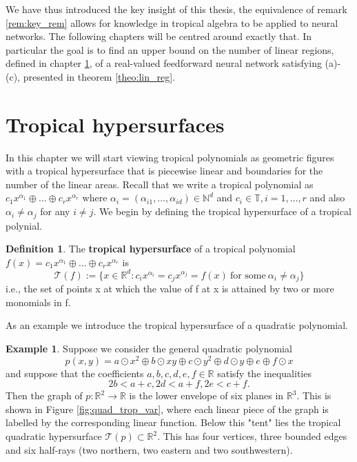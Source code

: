 \documentclass{article}
\theoremstyle{definition}
\newtheorem{definition}[theorem]{Definition}
\newtheorem{example}[theorem]{Example}
\begin{document}
We have thus introduced the key insight of this thesis, the equivalence of remark \ref{rem:key_rem} allows for knowledge in tropical algebra to be applied to neural networks. The following chapters will be centred around exactly that. In particular the goal is to find an upper bound on the number of linear regions, defined in chapter \ref{sec:tropical_hypersurfaces}, of a real-valued feedforward neural network satisfying (a)-(c), presented in theorem \ref{theo:lin_reg}.

\newpage

\section{Tropical hypersurfaces}
\label{sec:tropical_hypersurfaces}

In this chapter we will start viewing tropical polynomials as geometric figures with a tropical hypersurface that is piecewise linear and boundaries for the number of the linear areas. Recall that we write a tropical polynomial as $c_1 x^{\alpha_1} \oplus \dots \oplus c_r x^{\alpha_r}$ where $\alpha_i = (\alpha_{i1}, \dots , \alpha_{id}) \in \mathbb{N}^{d}$ and $c_i \in \mathbb{T}, i=1, \dots , r$ and also $\alpha_i \neq \alpha_j$ for any $i \neq j$. We begin by defining the tropical hypersurface of a tropical polynial. 
 
\begin{definition}\hspace{1sp}\cite[p.~3]{zhang2018tropical}
\label{def:trop_hyper}
The \textbf{tropical hypersurface} of a tropical polynomial $f(x) = c_1 x^{\alpha_1} \oplus \dots \oplus c_r x^{\alpha_r}$ is 
$$\mathcal{T}(f) := \{ x \in \mathbb{R}^{d} : c_i x^{\alpha_i} = c_j x^{\alpha_j} = f(x) \ \text{for some} \ \alpha_i \neq \alpha_j \}$$
i.e., the set of points x at which the value of f at x is attained by two or more monomials in f.
\end{definition}
As an example we introduce the tropical hypersurface of a quadratic polynomial.
\begin{example}\hspace{1sp}\cite[p.~23]{maclagan2015introduction}
Suppose we consider the general quadratic polynomial
$$p(x, y) = a \odot x^{2} \oplus b \odot xy \oplus c \odot y^{2} \oplus d \odot y \oplus e \oplus f \odot x$$
and suppose that the coefficients $a,b,c,d,e,f \in \mathbb{R}$ satisfy the inequalities
$$2b < a+c, 2d < a + f, 2e < c + f.$$
Then the graph of $p:\mathbb{R}^{2} \to \mathbb{R}$ is the lower envelope of six planes in $\mathbb{R}^{3}$. This is shown in Figure \ref{fig:quad_trop_var}, where each linear piece of the graph is labelled by the corresponding linear function. Below this "tent" lies the tropical quadratic hypersurface $\mathcal{T}(p) \subset \mathbb{R}^{2}$. This has four vertices, three bounded edges and six half-rays (two northern, two eastern and two southwestern).
\end{example}
\end{document}
